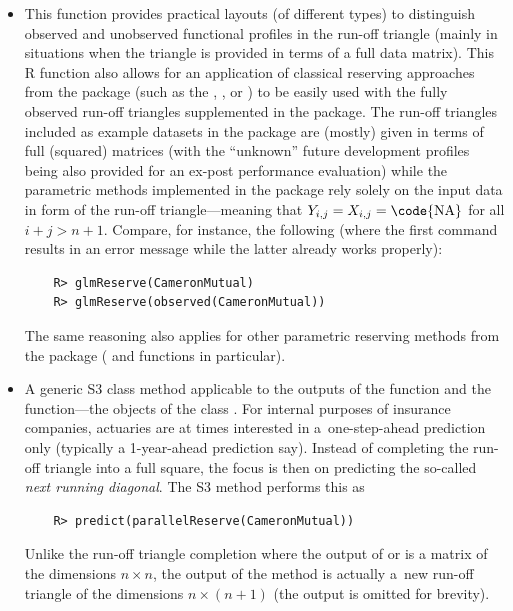 \begin{itemize}[topsep=0pt, partopsep=0pt, itemsep=5pt, parsep=0pt, labelindent=0pt, leftmargin=10pt]
    \item {} This function provides practical layouts (of different types) to distinguish observed and un\-ob\-served functional profiles in the run-off triangle (mainly in situations when the triangle is provided in terms of a full data matrix). This R function 
    also allows for an application of classical reserving approaches from the  package (such as the , , or ) to be easily used with the fully observed run-off triangles supplemented in the  package. The run-off triangles included as example datasets in the  package are (mostly) given in terms of full (squared) matrices (with the ``unknown'' future development profiles being also provided for an ex-post performance evaluation) while the parametric methods implemented in the  package rely solely on the input data in  form of the run-off triangle---meaning that $Y_{i,j} = X_{i,j} = \textrm{\code{NA}}$ for all $i + j > n + 1$.  Compare, for instance, the following (where the first command results in an error message while the latter already works properly): 
    \begin{verbatim}
    R> glmReserve(CameronMutual)
    R> glmReserve(observed(CameronMutual))
    \end{verbatim}
    The same reasoning also applies for other parametric reserving methods from the  package ( and  functions in particular).

    \item {}  A generic S3 class method applicable to the outputs of the  function and the  function---the objects of the class . For internal purposes of insurance companies, actuaries are at times interested in a~one-step-ahead prediction only (typically a 1-year-ahead prediction say). Instead of completing the run-off triangle into a full square, the focus is then on predicting the so-called \emph{next running diagonal}. The S3 method  performs this as
    \begin{verbatim}
    R> predict(parallelReserve(CameronMutual))
    \end{verbatim}
    Unlike the run-off triangle completion where the output of  or  is a matrix of the dimensions $n \times n$, the output of the  method is actually a~new run-off triangle of the dimensions $n \times (n + 1)$ (the output is omitted for brevity).
\end{itemize}

